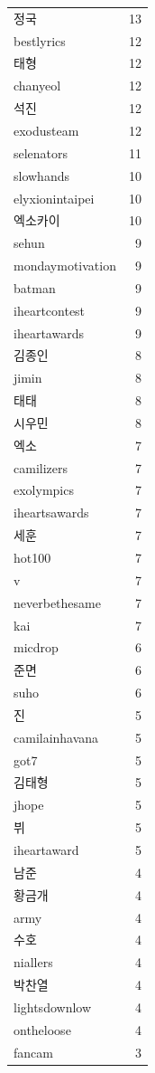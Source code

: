 \begin{tabular}{lr}
정국 & 13 \\
bestlyrics & 12 \\
태형 & 12 \\
chanyeol & 12 \\
석진 & 12 \\
exodusteam & 12 \\
selenators & 11 \\
slowhands & 10 \\
elyxionintaipei & 10 \\
엑소카이 & 10 \\
sehun & 9 \\
mondaymotivation & 9 \\
batman & 9 \\
iheartcontest & 9 \\
iheartawards️ & 9 \\
김종인 & 8 \\
jimin & 8 \\
태태 & 8 \\
시우민 & 8 \\
엑소 & 7 \\
camilizers & 7 \\
exolympics & 7 \\
iheartsawards & 7 \\
세훈 & 7 \\
hot100 & 7 \\
v & 7 \\
neverbethesame & 7 \\
kai & 7 \\
micdrop & 6 \\
준면 & 6 \\
suho & 6 \\
진 & 5 \\
camilainhavana & 5 \\
got7 & 5 \\
김태형 & 5 \\
jhope & 5 \\
뷔 & 5 \\
iheartaward & 5 \\
남준 & 4 \\
황금개 & 4 \\
army & 4 \\
수호 & 4 \\
niallers & 4 \\
박찬열 & 4 \\
lightsdownlow & 4 \\
ontheloose & 4 \\
fancam & 3 \\

\end{tabular}
